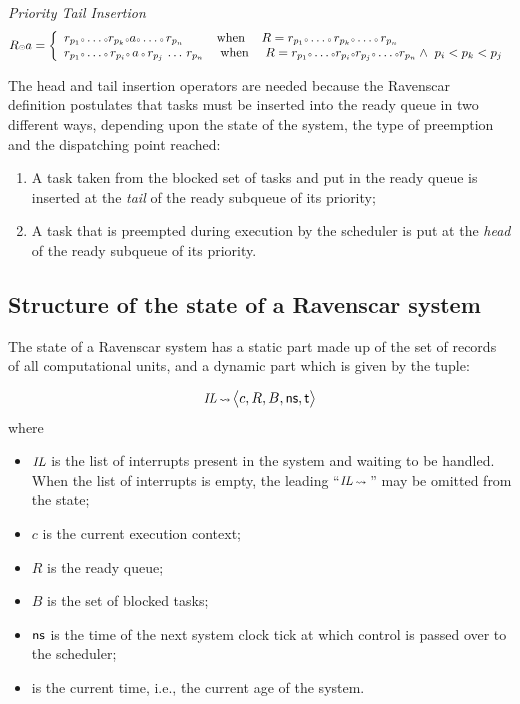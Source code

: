 \hspace{-7mm} \emph{Priority Tail Insertion} \\
\begin{equation}
\label{pri_tl_ins}
  R \smodot a  = \left \{
    \begin{array}{l}
      r_{p_1}\smcirc\ldots\smcirc r_{p_k}\smcirc a\smcirc\ldots\smcirc\,r_{p_n} 
      \ \ \ \ \ \ \ \ \text{when}\ \ \ \ 
      R=r_{p_1}\smcirc\ldots\smcirc\,r_{p_k}\smcirc\ldots\smcirc\,r_{p_n}  \\ 
      r_{p_1}\smcirc\ldots\smcirc\,r_{p_i}\smcirc\,a\,\smcirc\,r_{p_j}\,\ldots\,r_{p_n}
      \ \ \ \ \text{when} \ \ \ \   
      R = r_{p_1}\smcirc\ldots\smcirc r_{p_i}\smcirc r_{p_j}\smcirc\ldots\smcirc r_{p_n} 
       \wedge \  p_i < p_k < p_j  
    \end{array} 
  \right.
\end{equation}

The head and tail insertion operators are needed because the Ravenscar
definition postulates that tasks must be inserted into the ready queue
in two different ways, depending upon the state of the system, the
type of preemption and the dispatching point reached:

\begin{enumerate}
\item{A task taken from the blocked set of tasks and put in the ready
  queue is inserted at the \emph{tail} of the ready subqueue of its
  priority;}
\item{A task that is preempted during execution by the scheduler is
  put at the \emph{head} of the ready subqueue of its priority.}
\end{enumerate}

\subsection{Structure of the state of a Ravenscar system}
The state of a Ravenscar system has a static part made up of the set
of records of all computational units, and a dynamic part which is
given by the tuple:

\begin{equation}
  \text{\small \textit{IL}} \,{\scriptstyle\leadsto}\,
  \big\langle c, R, B, \text{\sffamily ns}, \text{\sffamily t} \big\rangle
\end{equation}
\noindent
where 
\begin{itemize}
  \item{$\text{\small \textit{IL}}$ is the list of interrupts present
    in the system and waiting to be handled. When the list of
    interrupts is empty, the leading ``$\text{\small \textit{IL}}
    \,{\scriptstyle\leadsto}\,$'' may be omitted from the state;}
  \item{$c$ is the current execution context;}
  \item{$R$ is the ready queue;}
  \item{$B$ is the set of blocked tasks;} 
  \item{$\text{\sffamily ns}$ is the time of the next system clock
    tick at which control is passed over to the scheduler;}
  \item{\SFT{t} is the current time, i.e., the current age of the
    system.}
\end{itemize}


